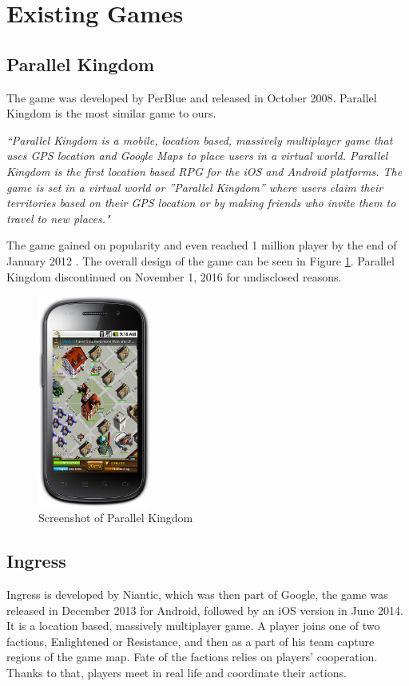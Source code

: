 
\section{Existing Games}

	\subsection{Parallel Kingdom}
	The game was developed by PerBlue and released in October 2008. Parallel Kingdom is the most similar game to ours.
		
	\textit{``Parallel Kingdom is a mobile, location based, massively multiplayer game that uses GPS location and Google Maps to place users in a virtual world. Parallel Kingdom is the first location based RPG for the iOS and Android platforms. The game is set in a virtual world or ”Parallel Kingdom” where users claim their territories based on their GPS location or by making friends who invite them to travel to new places."} \cite{parallelkingdom}
	
	The game gained on popularity and even reached 1 million player by the end of January 2012 \cite{parallelkingdom1m}. The overall design of the game can be seen in Figure \ref{fig:parallelkingdom}. Parallel Kingdom discontinued on November 1, 2016 for undisclosed reasons.
	
	\begin{figure}[h]	
		\includegraphics[width=0.33\textwidth]{figures/parallelkingdom}
		\centering			
		\caption{Screenshot of Parallel Kingdom \cite{parallelkingdomscreen}}
		\label{fig:parallelkingdom}
	\end{figure}
	
	\subsection{Ingress}
	Ingress is developed by Niantic, which was then part of Google, the game was released in December 2013 for Android, followed by an iOS version in June 2014. It is a location based, massively multiplayer game. A player joins one of two factions, Enlightened or Resistance, and then as a part of his team capture regions of the game map. Fate of the factions relies on players’ cooperation. Thanks to that, players meet in real life and coordinate their actions.
	
